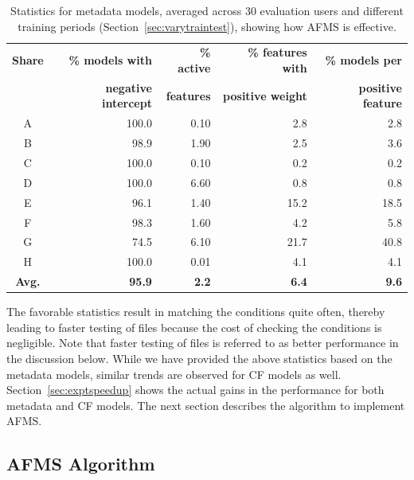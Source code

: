 \begin{table}
{\fontsize{8pt}{1em}\selectfont
\begin{center}
\caption{ Statistics for metadata models, averaged across 30 evaluation users and
  different training periods (Section~\ref{sec:varytraintest}), showing how
  AFMS is effective.}
\begin{tabular}{|c|r|r|r|r|}
  \hline

\textbf{Share} & \textbf{\% models with} & \textbf{\% active} &
\textbf{\% features with} & \textbf{\% models per} \tabularnewline
& \textbf{negative intercept} & \textbf{features} & \textbf{positive
weight} & \textbf{positive feature} \tabularnewline \hline

A & 100.0 & 0.10 & 2.8 & 2.8  \tabularnewline  \hline
B & 98.9 & 1.90 & 2.5 & 3.6   \tabularnewline  \hline
C & 100.0 & 0.10 & 0.2 & 0.2  \tabularnewline  \hline
D & 100.0 & 6.60 & 0.8 & 0.8  \tabularnewline  \hline
E & 96.1 & 1.40 & 15.2 & 18.5 \tabularnewline  \hline
F & 98.3 & 1.60 & 4.2 & 5.8   \tabularnewline  \hline
G & 74.5 & 6.10 & 21.7 & 40.8 \tabularnewline  \hline
H & 100.0 & 0.01 & 4.1 & 4.1  \tabularnewline  \hline
\textbf{Avg.} & \textbf{95.9} & \textbf{2.2} & \textbf{6.4} & \textbf{9.6} \tabularnewline \hline
\end{tabular}
\end{center}
}
\vspace{-0.1in}

\label{tab:SpeedupPotentialStats}
\end{table}
The favorable statistics result in matching the conditions quite
often, thereby leading to faster testing of files because the cost of
checking the conditions is negligible. Note that faster testing of files is 
referred to as better performance in the discussion below. 
While we have provided the above 
statistics based on the metadata models, similar trends are observed for CF models 
as well. 
Section~\ref{sec:exptspeedup}
shows the actual gains in the performance for both metadata and CF models.  The next section describes
the algorithm to implement AFMS.

\subsection{AFMS Algorithm}
\label{sec:AFMSAlgorithm}

